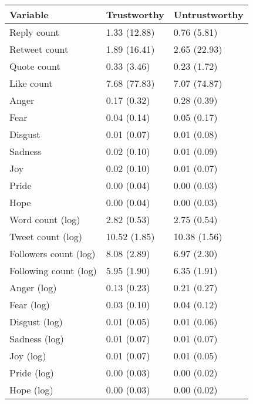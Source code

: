 \begin{tabular}{lll}
\toprule
             Variable &  Trustworthy & Untrustworthy \\
\midrule
          Reply count & 1.33 (12.88) &   0.76 (5.81) \\
        Retweet count & 1.89 (16.41) &  2.65 (22.93) \\
          Quote count &  0.33 (3.46) &   0.23 (1.72) \\
           Like count & 7.68 (77.83) &  7.07 (74.87) \\
                Anger &  0.17 (0.32) &   0.28 (0.39) \\
                 Fear &  0.04 (0.14) &   0.05 (0.17) \\
              Disgust &  0.01 (0.07) &   0.01 (0.08) \\
              Sadness &  0.02 (0.10) &   0.01 (0.09) \\
                  Joy &  0.02 (0.10) &   0.01 (0.07) \\
                Pride &  0.00 (0.04) &   0.00 (0.03) \\
                 Hope &  0.00 (0.04) &   0.00 (0.03) \\
     Word count (log) &  2.82 (0.53) &   2.75 (0.54) \\
    Tweet count (log) & 10.52 (1.85) &  10.38 (1.56) \\
Followers count (log) &  8.08 (2.89) &   6.97 (2.30) \\
Following count (log) &  5.95 (1.90) &   6.35 (1.91) \\
          Anger (log) &  0.13 (0.23) &   0.21 (0.27) \\
           Fear (log) &  0.03 (0.10) &   0.04 (0.12) \\
        Disgust (log) &  0.01 (0.05) &   0.01 (0.06) \\
        Sadness (log) &  0.01 (0.07) &   0.01 (0.07) \\
            Joy (log) &  0.01 (0.07) &   0.01 (0.05) \\
          Pride (log) &  0.00 (0.03) &   0.00 (0.02) \\
           Hope (log) &  0.00 (0.03) &   0.00 (0.02) \\
\bottomrule
\end{tabular}
